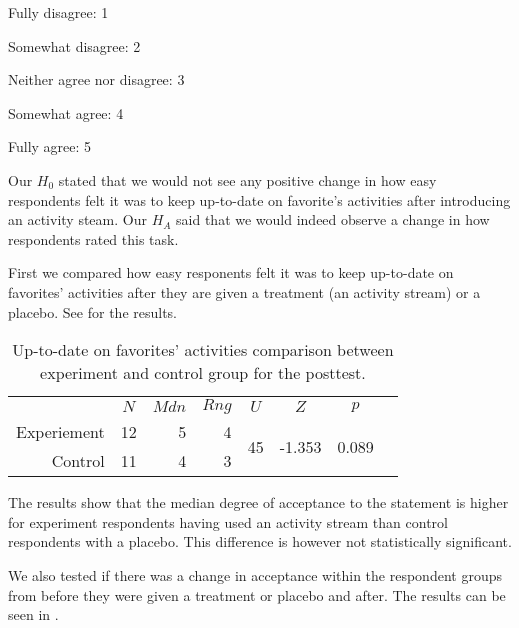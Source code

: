 \begin{items}
  \item Fully disagree: 1
  \item Somewhat disagree: 2
  \item Neither agree nor disagree: 3
  \item Somewhat agree: 4
  \item Fully agree: 5
\end{items}

Our $H_0$ stated that we would not see any positive change in how easy
respondents felt it was to keep up-to-date on favorite's activities
after introducing an activity steam. Our $H_A$ said that we
would indeed observe a change in how respondents rated this task.

First we compared how easy responents felt it was to keep up-to-date on
favorites' activities after they are given a treatment (an activity stream)
or a placebo.
See
 for the results.

\begin{table}
  \begin{tabular}{rrrrrrrr}

    &
    \multicolumn{1}{c}{$N$} &
    \multicolumn{1}{c}{$Mdn$} &
    \multicolumn{1}{c}{$Rng$} &
    \multicolumn{1}{c}{$U$} &
    \multicolumn{1}{c}{$Z$} &
    \multicolumn{1}{c}{$p$} \\

    \cmidrule(lr){2-7}

    Experiement &
    12 &
    5 &
    4 &
    \multirow{2}{*}{45} &
    \multirow{2}{*}{-1.353} &
    \multirow{2}{*}{0.089}\\

    Control &
    11 &
    4 &
    3 &
    &
    \\

  \end{tabular}
  \caption[Up-to-date on Favorites' Activities, Between Groups]{%
    Up-to-date on favorites' activities comparison between
    experiment and control group for the posttest.
  }
  \label{table:uptodate.favorite.activities.between}
\end{table}

The results show that the median degree of acceptance to the statement
is higher for experiment respondents having used an activity stream than
control respondents with a placebo. This difference is however
not statistically significant.

We also tested if there was a change in acceptance within the respondent
groups from before they were given a treatment or placebo and after.
The results can be seen in
.

